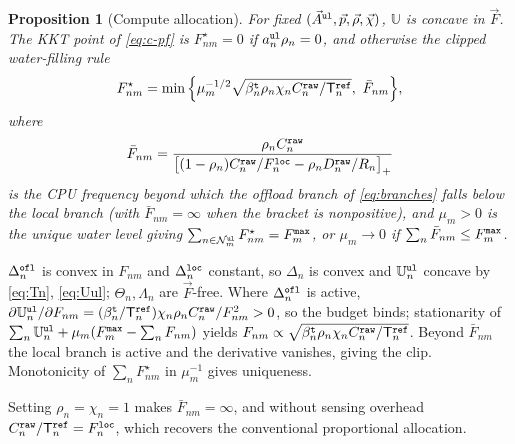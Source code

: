 \documentclass[journal]{IEEEtran}
\newtheorem{proposition}{Proposition}
\begin{document}
\begin{proposition}[Compute allocation]\label{prop:F}
For fixed $(\vec{A}^{\tt ul},\vec{p},\vec{\rho},\vec{\chi})$, $\mathbb{U}$ is concave in $\vec{F}$. The KKT point of \eqref{eq:c-pf} is $F_{nm}^\star=0$ if $a_n^{\tt ul}\rho_n=0$, and otherwise the clipped water-filling rule
\begin{equation}
F_{nm}^\star
=\min\Big\{\mu_m^{-1/2}\sqrt{\beta_n^{\tt t}\rho_n\chi_n C_n^{\tt raw}/\mathsf{T}_n^{\tt ref}},\ \bar F_{nm}\Big\},
\label{eq:Fstar}
\end{equation}
where
\begin{equation}
\bar F_{nm}
=\frac{\rho_n C_n^{\tt raw}}
{\big[(1-\rho_n)C_n^{\tt raw}/F_n^{\tt loc}-\rho_n D_n^{\tt raw}/R_n\big]_+}
\label{eq:Fbar}
\end{equation}
is the {\color{blue}CPU frequency} beyond which the offload branch of \eqref{eq:branches} falls below the local branch (with $\bar F_{nm}=\infty$ when the bracket is nonpositive), and $\mu_m>0$ is the unique water level giving $\sum_{n\in\mathcal{N}_m^{\tt ul}}F_{nm}^\star=F_m^{\tt max}$, or $\mu_m\to0$ if $\sum_n\bar F_{nm}\le F_m^{\tt max}$.
\end{proposition}
\begin{IEEEproof}
$\Delta_n^{\tt ofl}$ is convex in $F_{nm}$ and $\Delta_n^{\tt loc}$ constant, so $\Delta_n$ is convex and $\mathbb{U}_n^{\tt ul}$ concave by \eqref{eq:Tn}, \eqref{eq:Uul}; $\Theta_n,\Lambda_n$ are $\vec{F}$-free. Where $\Delta_n^{\tt ofl}$ is active, $\partial\mathbb{U}_n^{\tt ul}/\partial F_{nm}=(\beta_n^{\tt t}/\mathsf{T}_n^{\tt ref})\chi_n\rho_n C_n^{\tt raw}/F_{nm}^2>0$, so the budget binds; stationarity of $\sum_n\mathbb{U}_n^{\tt ul}+\mu_m(F_m^{\tt max}-\sum_n F_{nm})$ yields $F_{nm}\propto\sqrt{\beta_n^{\tt t}\rho_n\chi_n C_n^{\tt raw}/\mathsf{T}_n^{\tt ref}}$. Beyond $\bar F_{nm}$ the local branch is active and the derivative vanishes, giving the clip. Monotonicity of $\sum_n F_{nm}^\star$ in $\mu_m^{-1}$ gives uniqueness.
\end{IEEEproof}
Setting $\rho_n=\chi_n=1$ makes $\bar F_{nm}=\infty$, and without sensing overhead $C_n^{\tt raw}/\mathsf{T}_n^{\tt ref}=F_n^{\tt loc}$, which recovers the conventional proportional allocation.
\end{document}
